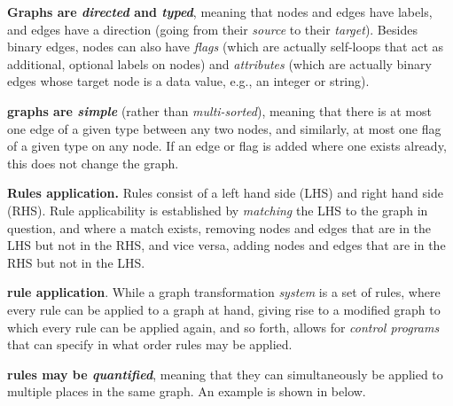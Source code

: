 %
%
%

\textbf{Graphs are \emph{directed} and \emph{typed}}, meaning that nodes and edges have labels, and edges have a direction (going from their \emph{source} to their \emph{target}). Besides binary edges, nodes can also have \emph{flags} (which are actually self-loops that act as additional, optional labels on nodes) and \emph{attributes} (which are actually binary edges whose target node is a data value, e.g., an integer or string).

\textbf{\GROOVE graphs are \emph{simple}} (rather than \emph{multi-sorted}), meaning that there is at most one edge of a given type between any two nodes, and similarly, at most one flag of a given type on any node. If an edge or flag is added where one exists already, this does not change the graph.

\textbf{Rules application.}
Rules consist of a left hand side (LHS) and right hand side (RHS). Rule applicability is established by \emph{matching} the LHS to the graph in question, and where a match exists, removing nodes and edges that are in the LHS but not in the RHS, and vice versa, adding nodes and edges that are in the RHS but not in the LHS.

\textbf{\GROOVE rule application}.
While a graph transformation \emph{system} is a set of rules, where every rule can be applied to a graph at hand, giving rise to a modified graph to which every rule can be applied again, and so forth, \GROOVE allows for \emph{control programs} that can specify in what order rules may be applied.

\textbf{\GROOVE rules may be \emph{quantified}}, meaning that they can simultaneously be applied to multiple places in the same graph. An example is shown in  below.

